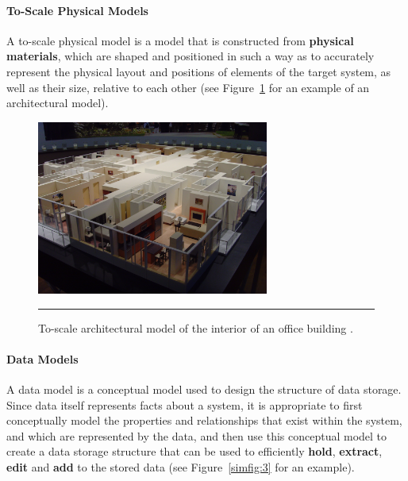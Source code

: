 \paragraph{To-Scale Physical Models}

A to-scale physical model is a model that is constructed from \textbf{physical materials}, which are shaped and positioned in such a way as to accurately represent the physical layout and positions of elements of the target system, as well as their size, relative to each other (see Figure~\ref{simfig:2} for an example of an architectural model).

\begin{figure}[!t]
	\centering
		\includegraphics[width=0.68\textwidth]{images/SIM/Architectural_model_condo_interior.jpg}
	\caption[\small A to-scale architectural model]{\small To-scale architectural model of the interior of an office building \cite{SIM_TSAM}.}
	\label{simfig:2}\hrule
\end{figure}
\afterpage{\FloatBarrier}


\paragraph{Data Models}

A data model is a conceptual model used to design the structure of data storage. Since data itself represents facts about a system, it is appropriate to first conceptually model the properties and relationships that exist within the system, and which are represented by the data, and then use this conceptual model to create a data storage structure that can be used to efficiently \textbf{hold}, \textbf{extract}, \textbf{edit} and \textbf{add} to the stored data (see Figure~\ref{simfig:3} for an example).

